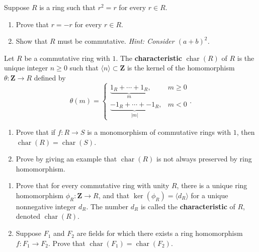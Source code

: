 \documentclass[11pt,twoside,openany]{memoir}
\begin{document}
    \begin{exercise}
    Suppose $R$ is a ring such that $r^2=r$ for every $r\in R$.
    \begin{enumerate}[label = (\arabic*)]
        \item Prove that $r=-r$ for every $r\in R$.
        \item Show that $R$ must be commutative. \textit{Hint: Consider $(a+b)^2$.}
    \end{enumerate}
    \end{exercise}
    
    \begin{exercise}
    Let $R$ be a commutative ring with $1$. The \textbf{characteristic} $\operatorname{char}(R)$ of $R$ is the unique integer $n\ge 0$ such that $\langle n\rangle \subset \mathbf{Z}$ is the kernel of the homomorphism $\theta:\mathbf{Z}\to R$ defined by
    \[
    \theta(m)=\begin{cases} \underbrace{1_R+\cdots +1_R}_{m}, & m\ge 0\\
    \underbrace{-1_R+\cdots + -1_R}_{|m|}, & m<0 \end{cases}.
    \]
    \begin{enumerate}[label = (\arabic*)]
        \item Prove that if $f:R\to S$ is a monomorphism of commutative rings with $1$, then $\operatorname{char}(R)=\operatorname{char}(S)$.
        \item Prove by giving an example that $\operatorname{char}(R)$ is not always preserved by ring homomorphism.
    \end{enumerate}
    \end{exercise}
    
    \newpage
    \begin{exercise}
    \phantom{a}
    \begin{enumerate}[label = (\arabic*)]
        \item Prove that for every commutative ring with unity $R$, there is a unique ring homomorphism $\phi_R:\mathbf{Z}\to R$, and that $\ker(\phi_R)=\langle d_R\rangle$ for a unique nonnegative integer $d_R$. The number $d_R$ is called the \textbf{characteristic} of $R$, denoted $\operatorname{char}(R)$.
        \item Suppose $F_1$ and $F_2$ are fields for which there exists a ring homomorphism $f:F_1\to F_2$. Prove that $\operatorname{char}(F_1)=\operatorname{char}(F_2)$.
    \end{enumerate}
    \end{exercise}
    
\end{document}
